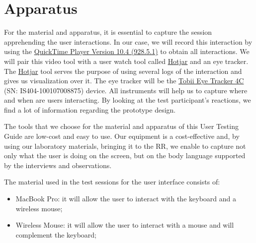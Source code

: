 
\section{Apparatus}
\label{sec:sec005}

For the material and apparatus, it is essential to capture the session apprehending the user interactions. In our case, we will record this interaction by using the \hyperlink{https://support.apple.com/quicktime}{QuickTime Player Version 10.4 (928.5.1)} to obtain all interactions. We will pair this video tool with a user watch tool called \hyperlink{https://www.hotjar.com/}{Hotjar} and an eye tracker. The \hyperlink{https://www.hotjar.com/}{Hotjar} tool serves the purpose of using several logs of the interaction and gives us visualization over it. The eye tracker will be the \hyperlink{https://gaming.tobii.com/product/tobii-eye-tracker-4c/}{Tobii Eye Tracker 4C} (SN: IS404-100107008875) device. All instruments will help us to capture where and when are users interacting. By looking at the test participant's reactions, we find a lot of information regarding the prototype design.

The tools that we choose for the material and apparatus of this User Testing Guide are low-cost and easy to use. Our equipment is a cost-effective and, by using our laboratory materials, bringing it to the RR, we enable to capture not only what the user is doing on the screen, but on the body language supported by the interviews and observations.

\hfill

The material used in the test sessions for the user interface consists of:

\begin{itemize}
\item MacBook Pro: it will allow the user to interact with the keyboard and a wireless mouse;
\item Wireless Mouse: it will allow the user to interact with a mouse and will complement the keyboard;
\end{itemize}


